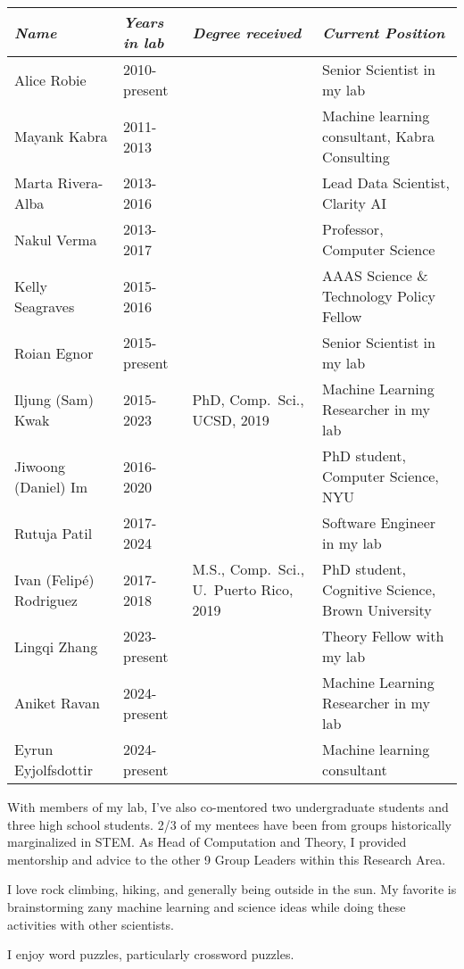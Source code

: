 \documentclass[11pt, letterpaper]{awesome-cv}
\begin{document}
\vspace{\acvSectionContentTopSkip}
\vspace{\acvSectionContentTopSkip}
\begingroup
\begin{center}
\fontsize{10pt}{1em}\bodyfont\upshape\selectfont
\setlength{\tabcolsep}{6pt}
\begin{tabular}{ll>{\raggedright\arraybackslash}p{2in}>{\raggedright\arraybackslash}p{2.5in}}
\hline
  {\em Name} & {\em Years in lab} & {\em Degree received} & {\em Current Position} \\\hline\hline
  Alice Robie & 2010-present & & Senior Scientist in my lab \\
  Mayank Kabra & 2011-2013 & & Machine learning consultant, Kabra Consulting \\
  Marta Rivera-Alba & 2013-2016& & Lead Data Scientist, Clarity AI\\
  Nakul Verma & 2013-2017 & & Professor, Computer Science\\
  Kelly Seagraves & 2015-2016 & & AAAS Science \& Technology Policy Fellow\\
  Roian Egnor & 2015-present & & Senior Scientist in my lab\\
  Iljung (Sam) Kwak & 2015-2023 & PhD, Comp.~Sci., UCSD, 2019 & Machine Learning Researcher in my lab\\
  Jiwoong (Daniel) Im & 2016-2020 & & PhD student, Computer Science, NYU\\
  Rutuja Patil & 2017-2024 & & Software Engineer in my lab\\
  Ivan (Felip\'e) Rodriguez & 2017-2018 & M.S., Comp.~Sci., U.~Puerto Rico, 2019 & PhD student, Cognitive Science, Brown University \\
  Lingqi Zhang & 2023-present & & Theory Fellow with my lab \\
  Aniket Ravan & 2024-present & & Machine Learning Researcher in my lab \\
  Eyrun Eyjolfsdottir & 2024-present & & Machine learning consultant \\\hline
\end{tabular}
\end{center}
\endgroup
\vspace{.25cm}
With members of my lab, I've also co-mentored two undergraduate students and three high school students. 2/3 of my mentees have been from groups historically marginalized in STEM. As Head of Computation and Theory, I provided mentorship and advice to the other 9 Group Leaders within this Research Area. 

\vspace{\acvSectionContentTopSkip}


\vspace{\acvSectionContentTopSkip}
\begin{cvitems}
\item I love rock climbing, hiking, and generally being outside in the sun. My favorite is brainstorming zany machine learning and science ideas while doing these activities with other scientists. 
\item I enjoy word puzzles, particularly crossword puzzles. 
\end{cvitems}
 
\end{document}
